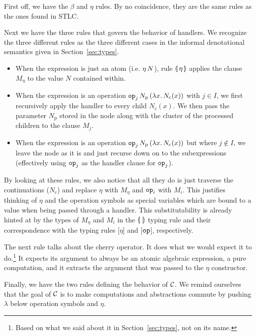 First off, we have the $\beta$ and $\eta$ rules. By no coincidence, they
are the same rules as the ones found in STLC.

Next we have the three rules that govern the behavior of handlers. We
recognize the three different rules as the three different cases in the
informal denotational semantics given in Section~\ref{sec:types}.

\begin{itemize}
\item When the expression is just an atom (i.e. $\eta\,N$), rule
  $\llparenthesis \, \eta \, \rrparenthesis$ applies the clause $M_\eta$ to the value $N$ contained
  within.
\item When the expression is an operation
  $\mathtt{op}_j\,N_{\mathrm{p}}\,(\lambda x.\, N_{\mathrm{c}}(x))$ with
  $j \in I$, we first recursively apply the handler to every child
  $N_{\mathrm{c}}(x)$. We then pass the parameter $N_{\mathrm{p}}$ stored
  in the node along with the cluster of the processed children to the
  clause $M_j$.
\item When the expression is an operation
  $\mathtt{op}_j\,N_{\mathrm{p}}\,(\lambda x.\, N_{\mathrm{c}}(x))$ but where
  $j \notin I$, we leave the node as it is and just recurse down on to the
  subexpressions (effectively using $\mathtt{op}_j$ as the handler clause for
  $\mathtt{op}_j$).
\end{itemize}

By looking at these rules, we also notice that all they do is just traverse
the continuations ($N_{\mathrm{c}}$) and replace $\eta$ with $M_\eta$ and
$\mathtt{op}_i$ with $M_i$. This justifies thinking of $\eta$ and the operation
symbols as special variables which are bound to a value when being passed
through a handler. This substitutability is already hinted at by the types
of $M_\eta$ and $M_i$ in the $\llparenthesis \,  \, \rrparenthesis$ typing rule and their
correspondence with the typing rules [$\eta$] and [$\mathtt{op}$],
respectively.

The next rule talks about the cherry operator. It does what we would expect
it to do.\footnote{Based on what we said about it in
  Section~\ref{sec:types}, not on its name.} It expects its argument to
always be an atomic algebraic expression, a pure computation, and it
extracts the argument that was passed to the $\eta$ constructor.

Finally, we have the two rules defining the behavior of $\mathcal{C}$. We remind
ourselves that the goal of $\mathcal{C}$ is to make computations and abstractions
commute by pushing $\lambda$ below operation symbols and $\eta$.

